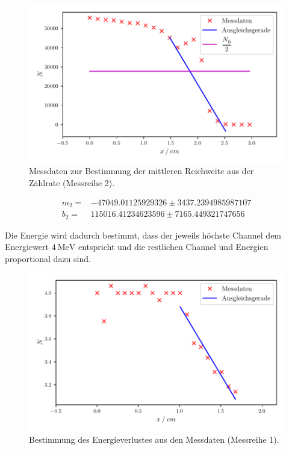\begin{figure}[H]
  \centering
  \includegraphics[width=\textwidth]{build/plot2.pdf}
  \caption {Messdaten zur Bestimmung der mittleren Reichweite aus der Zählrate (Messreihe 2).}
  \label{fig:plot2}
\end{figure}
\begin{align*}
  m_2 =& -47049.01125929326 ± 3437.2394985987107\\
  b_2 =& 115016.41234623596 ± 7165.449321747656
\end{align*}



Die Energie wird dadurch bestimmt, dass der jeweils höchste Channel dem
Energiewert $\SI{4}{\mega\eV}$ entspricht und die restlichen Channel und Energien
proportional dazu sind.

\begin{figure}[H]
  \centering
  \includegraphics[width=\textwidth]{build/plot3.pdf}
  \caption {Bestimmung des Energieverlustes aus den Messdaten (Messreihe 1).}
  \label{fig:plot3}
\end{figure}


